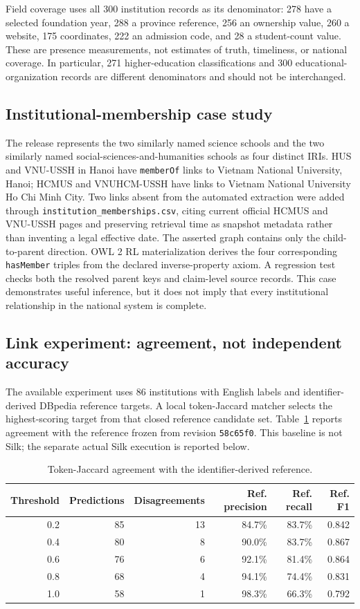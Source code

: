 \documentclass[11pt,a4paper]{article}
\newcommand{\term}[1]{\texttt{#1}}
\begin{document}
Field coverage uses all 300 institution records as its denominator: 278 have a selected
foundation year, 288 a province reference, 256 an ownership value, 260 a website, 175
coordinates, 222 an admission code, and 28 a student-count value. These are presence
measurements, not estimates of truth, timeliness, or national coverage. In particular,
271 higher-education classifications and 300 educational-organization records are
different denominators and should not be interchanged.

\subsection{Institutional-membership case study}
The release represents the two similarly named science schools and the two similarly named
social-sciences-and-humanities schools as four distinct IRIs. HUS and VNU-USSH in Hanoi
have \term{memberOf} links to Vietnam National University, Hanoi; HCMUS and VNUHCM-USSH
have links to Vietnam National University Ho Chi Minh City. Two links absent from the
automated extraction were added through \term{institution\_memberships.csv}, citing current
official HCMUS and VNU-USSH pages and preserving retrieval time as snapshot metadata rather
than inventing a legal effective date. The asserted graph contains only the child-to-parent
direction. OWL 2 RL materialization derives the four corresponding \term{hasMember} triples
from the declared inverse-property axiom. A regression test checks both the resolved parent
keys and claim-level source records. This case demonstrates useful inference, but it does
not imply that every institutional relationship in the national system is complete.

\subsection{Link experiment: agreement, not independent accuracy}
The available experiment uses 86 institutions with English labels and identifier-derived
DBpedia reference targets. A local token-Jaccard matcher selects the highest-scoring target
from that closed reference candidate set. Table~\ref{tab:agreement} reports agreement with
the reference frozen from revision \term{58c65f0}. This baseline is not Silk;
the separate actual Silk execution is reported below.
\begin{table}[htbp]\centering\small
\caption{Token-Jaccard agreement with the identifier-derived reference.}\label{tab:agreement}
\begin{tabular}{rrrrrr}\toprule
Threshold & Predictions & Disagreements & Ref. precision & Ref. recall & Ref. F1 \\\midrule
0.2 & 85 & 13 & 84.7\% & 83.7\% & 0.842 \\
0.4 & 80 & 8 & 90.0\% & 83.7\% & 0.867 \\
0.6 & 76 & 6 & 92.1\% & 81.4\% & 0.864 \\
0.8 & 68 & 4 & 94.1\% & 74.4\% & 0.831 \\
1.0 & 58 & 1 & 98.3\% & 66.3\% & 0.792 \\
\bottomrule\end{tabular}
\end{table}
\end{document}
